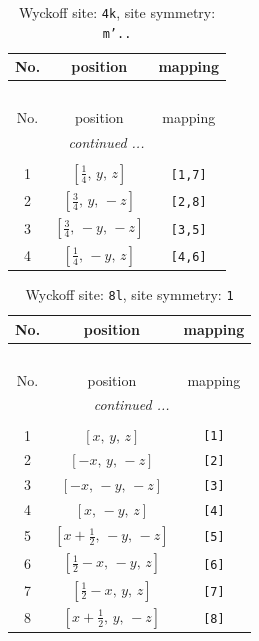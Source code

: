 \documentclass[fleqn,8pt]{jsarticle}
\begin{document}
\renewcommand{\arraystretch}{1.2}
\begin{longtable}{ccc}
\caption{Wyckoff site: {\tt 4k}, site symmetry: {\tt m'..}}
 \\
 \hline \hline
No. & position & mapping \\ \hline \endfirsthead

\multicolumn{2}{l}{\tablename\ \thetable{}} \\
 \hline \hline
No. & position & mapping \\ \hline \endhead

 \hline \hline
\multicolumn{2}{r}{\footnotesize\it continued ...} \\ \endfoot

 \hline \hline
\multicolumn{2}{r}{} \\ \endlastfoot

1 & $\left[ \frac{1}{4},\, y,\, z \right]$ & {\tt [1,7]} \\ \hline
2 & $\left[ \frac{3}{4},\, y,\, - z \right]$ & {\tt [2,8]} \\ \hline
3 & $\left[ \frac{3}{4},\, - y,\, - z \right]$ & {\tt [3,5]} \\ \hline
4 & $\left[ \frac{1}{4},\, - y,\, z \right]$ & {\tt [4,6]} \\
\end{longtable}
\renewcommand{\arraystretch}{1.2}
\begin{longtable}{ccc}
\caption{Wyckoff site: {\tt 8l}, site symmetry: {\tt 1}}
 \\
 \hline \hline
No. & position & mapping \\ \hline \endfirsthead

\multicolumn{2}{l}{\tablename\ \thetable{}} \\
 \hline \hline
No. & position & mapping \\ \hline \endhead

 \hline \hline
\multicolumn{2}{r}{\footnotesize\it continued ...} \\ \endfoot

 \hline \hline
\multicolumn{2}{r}{} \\ \endlastfoot

1 & $\left[ x,\, y,\, z \right]$ & {\tt [1]} \\ \hline
2 & $\left[ - x,\, y,\, - z \right]$ & {\tt [2]} \\ \hline
3 & $\left[ - x,\, - y,\, - z \right]$ & {\tt [3]} \\ \hline
4 & $\left[ x,\, - y,\, z \right]$ & {\tt [4]} \\ \hline
5 & $\left[ x + \frac{1}{2},\, - y,\, - z \right]$ & {\tt [5]} \\ \hline
6 & $\left[ \frac{1}{2} - x,\, - y,\, z \right]$ & {\tt [6]} \\ \hline
7 & $\left[ \frac{1}{2} - x,\, y,\, z \right]$ & {\tt [7]} \\ \hline
8 & $\left[ x + \frac{1}{2},\, y,\, - z \right]$ & {\tt [8]} \\
\end{longtable}
\end{document}
